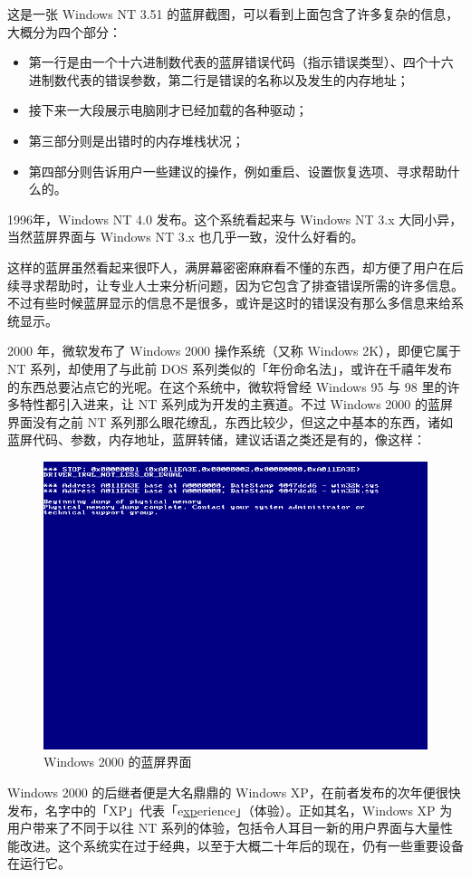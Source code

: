这是一张 Windows NT 3.51 的蓝屏截图，可以看到上面包含了许多复杂的信息，大概分为四个部分：
\begin{itemize}
  \item 第一行是由一个十六进制数代表的蓝屏错误代码（指示错误类型）、四个十六进制数代表的错误参数，第二行是错误的名称以及发生的内存地址；
  \item 接下来一大段展示电脑刚才已经加载的各种驱动；
  \item 第三部分则是出错时的内存堆栈状况；
  \item 第四部分则告诉用户一些建议的操作，例如重启、设置恢复选项、寻求帮助什么的。
\end{itemize}

1996年，Windows NT 4.0 发布。这个系统看起来与 Windows NT 3.x 大同小异，当然蓝屏界面与 Windows NT 3.x 也几乎一致，没什么好看的。

这样的蓝屏虽然看起来很吓人，满屏幕密密麻麻看不懂的东西，却方便了用户在后续寻求帮助时，让专业人士来分析问题，因为它包含了排查错误所需的许多信息。不过有些时候蓝屏显示的信息不是很多，或许是这时的错误没有那么多信息来给系统显示。

2000 年，微软发布了 Windows 2000 操作系统（又称 Windows 2K），即便它属于 NT 系列，却使用了与此前 DOS 系列类似的「年份命名法」，或许在千禧年发布的东西总要沾点它的光呢。在这个系统中，微软将曾经 Windows 95 与 98 里的许多特性都引入进来，让 NT 系列成为开发的主赛道。不过 Windows 2000 的蓝屏界面没有之前 NT 系列那么眼花缭乱，东西比较少，但这之中基本的东西，诸如蓝屏代码、参数，内存地址，蓝屏转储，建议话语之类还是有的，像这样：

\begin{figure}[htb!]
  \centering
  \includegraphics[width=.62\textwidth]{assets/advanced/Win-2K-BSoD.png}
  \caption{Windows 2000 的蓝屏界面}
  \label{fig:Win-2K-BSoD}
\end{figure}

Windows 2000 的后继者便是大名鼎鼎的 Windows XP，在前者发布的次年便很快发布，名字中的「XP」代表「e\underline{xp}erience」（体验）。正如其名，Windows XP 为用户带来了不同于以往 NT 系列的体验，包括令人耳目一新的用户界面与大量性能改进。这个系统实在过于经典，以至于大概二十年后的现在，仍有一些重要设备在运行它。

